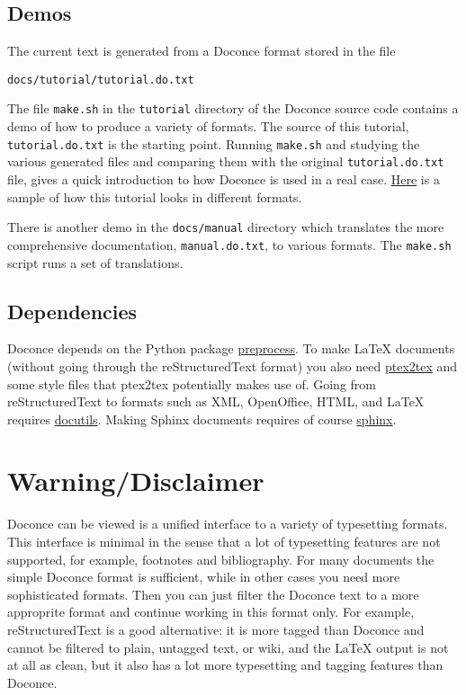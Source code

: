 \documentclass{article}
\begin{document}
\subsection{Demos}

The current text is generated from a Doconce format stored in the file
\begin{Verbatim}[fontsize=\fontsize{9pt}{9pt},tabsize=8,baselinestretch=0.85,
fontfamily=tt,xleftmargin=7mm]
docs/tutorial/tutorial.do.txt
\end{Verbatim}
\noindent
The file {\fontsize{10pt}{10pt}\verb!make.sh!} in the {\fontsize{10pt}{10pt}\verb!tutorial!} directory of the
Doconce source code contains a demo of how to produce a variety of
formats.  The source of this tutorial, {\fontsize{10pt}{10pt}\verb!tutorial.do.txt!} is the
starting point.  Running {\fontsize{10pt}{10pt}\verb!make.sh!} and studying the various generated
files and comparing them with the original {\fontsize{10pt}{10pt}\verb!tutorial.do.txt!} file,
gives a quick introduction to how Doconce is used in a real case.
\href{https://doconce.googlecode.com/hg/trunk/docs/demos/tutorial/index.html}{Here} 
is a sample of how this tutorial looks in different formats.

There is another demo in the {\fontsize{10pt}{10pt}\verb!docs/manual!} directory which
translates the more comprehensive documentation, {\fontsize{10pt}{10pt}\verb!manual.do.txt!}, to
various formats. The {\fontsize{10pt}{10pt}\verb!make.sh!} script runs a set of translations.

\subsection{Dependencies}

Doconce depends on the Python package
\href{http://code.google.com/p/preprocess/}{preprocess}.  To make {\LaTeX}
documents (without going through the reStructuredText format) you also
need \href{http://code.google.com/p/ptex2tex}{ptex2tex} and some style files
that ptex2tex potentially makes use of.  Going from reStructuredText
to formats such as XML, OpenOffice, HTML, and {\LaTeX} requires
\href{http://docutils.sourceforge.net/}{docutils}.  Making Sphinx documents
requires of course \href{http://sphinx.pocoo.org}{sphinx}.


\section{Warning/Disclaimer}

Doconce can be viewed is a unified interface to a variety of
typesetting formats.  This interface is minimal in the sense that a
lot of typesetting features are not supported, for example, footnotes
and bibliography. For many documents the simple Doconce format is
sufficient, while in other cases you need more sophisticated
formats. Then you can just filter the Doconce text to a more
approprite format and continue working in this format only.  For
example, reStructuredText is a good alternative: it is more tagged
than Doconce and cannot be filtered to plain, untagged text, or wiki,
and the {\LaTeX} output is not at all as clean, but it also has a lot
more typesetting and tagging features than Doconce.

\printindex
\end{document}
